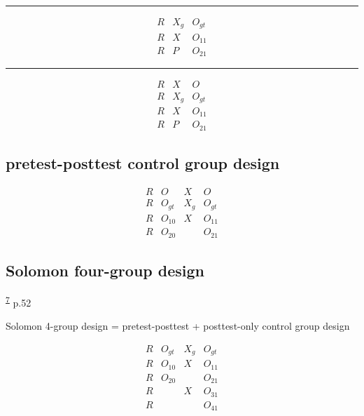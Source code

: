 \documentclass[
]{book}
\theoremstyle{definition}
\theoremstyle{definition}
\theoremstyle{definition}
\theoremstyle{definition}
\theoremstyle{remark}
\begin{document}
\begin{center}\rule{0.5\linewidth}{0.5pt}\end{center}

\[
\begin{array}{ccc}
R & X_{g} & O_{gt}\\
R & X & O_{11}\\
R & P & O_{21}
\end{array}
\]

\begin{center}\rule{0.5\linewidth}{0.5pt}\end{center}

\[
\begin{array}{ccc}
R & X & O\\
R & X_{g} & O_{gt}\\
R & X & O_{11}\\
R & P & O_{21}
\end{array}
\]

\hypertarget{pretest-posttest-control-group-design}{%
\subsection{pretest-posttest control group design}\label{pretest-posttest-control-group-design}}

\[
\begin{array}{cccc}
R & O & X & O\\
R & O_{gt} & X_{g} & O_{gt}\\
R & O_{10} & X & O_{11}\\
R & O_{20} &  & O_{21}
\end{array}
\]

\hypertarget{solomon-four-group-design}{%
\subsection{Solomon four-group design}\label{solomon-four-group-design}}

\textsuperscript{\protect\hyperlink{ref-hu2022}{7}} p.52

Solomon 4-group design = pretest-posttest + posttest-only control group design

\[
\begin{array}{cccc}
R & O_{gt} & X_{g} & O_{gt}\\
R & O_{10} & X & O_{11}\\
R & O_{20} &  & O_{21}\\
R &  & X & O_{31}\\
R &  &  & O_{41}
\end{array}
\]
\end{document}
